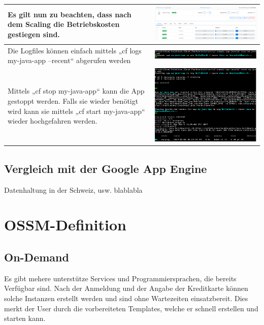 \begin{longtable}{| p{5cm} | p{11cm} |}
Es gilt nun zu beachten, dass nach dem Scaling die Betriebskosten gestiegen sind. &\includegraphics[width=0.65\columnwidth, valign=T]{images/image18.png} \\ \hline
Die Logfiles können einfach mittels „cf logs my-java-app --recent“ abgerufen werden &\includegraphics[width=0.65\columnwidth, valign=T]{images/image19.png} \\ \hline
Mittels „cf stop my-java-app“ kann die App gestoppt werden. Falls sie wieder benötigt wird kann sie mittels „cf start my-java-app“ wieder hochgefahren werden. 
&\includegraphics[width=0.65\columnwidth, valign=T]{images/image20.png} \\ \hline
\end{longtable}

\section{Vergleich mit der Google App Engine}
Datenhaltung in der Schweiz, usw. blablabla

\chapter{OSSM-Definition}
\section{On-Demand}
Es gibt mehere unterstütze Services und Programmiersprachen, die bereits Verfügbar sind. Nach der Anmeldung und der Angabe der Kreditkarte können solche Instanzen erstellt werden und sind ohne Wartezeiten einsatzbereit. Dies merkt der User durch die vorbereiteten Templates, welche er schnell erstellen und starten kann.
